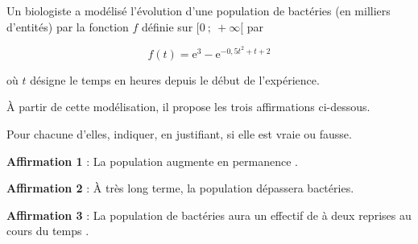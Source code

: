 \medskip

Un biologiste a modélisé l'évolution d'une population de bactéries (en milliers d'entités) par la fonction $f$ définie sur $[0~;~+\infty[$ par

\[f(t) = \text{e}^3 - \text{e}^{-0,5t^2 + t + 2}\]

où $t$ désigne le temps en heures depuis le début de l'expérience.

\medskip

À partir de cette modélisation, il propose les trois affirmations ci-dessous.

Pour chacune d'elles, indiquer, en justifiant, si elle est vraie ou fausse.

\begin{list}{\textbullet}{}
\item\textbf{Affirmation 1} : \og La population augmente en permanence \fg.

\item\textbf{Affirmation 2} : \og  À très long terme, la population dépassera  bactéries\fg.

\item\textbf{Affirmation 3} : \og La population de bactéries aura un effectif de  à deux reprises au cours du temps \fg.
\end{list}

